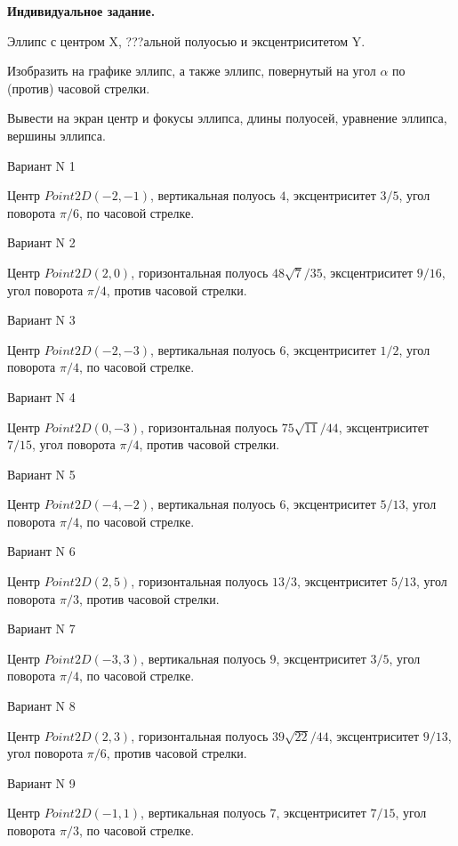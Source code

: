 \documentclass[11pt]{report}
\begin{document}
\pagestyle{empty}

{\bf Индивидуальное задание.}


Эллипс с центром X, ???альной полуосью  и эксцентриситетом Y.


Изобразить на графике эллипс, а также эллипс, повернутый на угол $\alpha$ по (против) часовой стрелки. 


Вывести на экран центр и фокусы эллипса, длины полуосей, уравнение эллипса, вершины эллипса.

Вариант N 1

Центр $Point2D\left(-2, -1\right)$, вертикальная полуось $4$, эксцентриситет $3 / 5$, угол поворота $\pi / 6$, по часовой стрелке.

Вариант N 2

Центр $Point2D\left(2, 0\right)$, горизонтальная полуось $48 \sqrt{7} / 35$, эксцентриситет $9 / 16$, угол поворота $\pi / 4$, против часовой стрелки.

Вариант N 3

Центр $Point2D\left(-2, -3\right)$, вертикальная полуось $6$, эксцентриситет $1 / 2$, угол поворота $\pi / 4$, по часовой стрелке.

Вариант N 4

Центр $Point2D\left(0, -3\right)$, горизонтальная полуось $75 \sqrt{11} / 44$, эксцентриситет $7 / 15$, угол поворота $\pi / 4$, против часовой стрелки.

Вариант N 5

Центр $Point2D\left(-4, -2\right)$, вертикальная полуось $6$, эксцентриситет $5 / 13$, угол поворота $\pi / 4$, по часовой стрелке.

Вариант N 6

Центр $Point2D\left(2, 5\right)$, горизонтальная полуось $13 / 3$, эксцентриситет $5 / 13$, угол поворота $\pi / 3$, против часовой стрелки.

Вариант N 7

Центр $Point2D\left(-3, 3\right)$, вертикальная полуось $9$, эксцентриситет $3 / 5$, угол поворота $\pi / 4$, по часовой стрелке.

Вариант N 8

Центр $Point2D\left(2, 3\right)$, горизонтальная полуось $39 \sqrt{22} / 44$, эксцентриситет $9 / 13$, угол поворота $\pi / 6$, против часовой стрелки.

Вариант N 9

Центр $Point2D\left(-1, 1\right)$, вертикальная полуось $7$, эксцентриситет $7 / 15$, угол поворота $\pi / 3$, по часовой стрелке.
\end{document}

